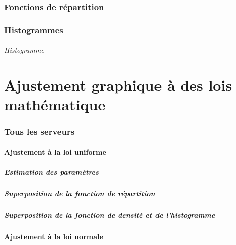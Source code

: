\documentclass{article}
\begin{document}
\section{Fonctions de répartition}

\section{Histogrammes}

\paragraph{Histogramme}
\begin{center}
\end{center}
\paragraph{}

\part{Ajustement graphique à des lois mathématique}

\section{Tous les serveurs}

\subsection{Ajustement à la loi uniforme}

\subsubsection{Estimation des paramètres}
\subsubsection{Superposition de la fonction de répartition}
\subsubsection{Superposition de la fonction de densité et de l'histogramme}

\subsection{Ajustement à la loi normale}
\end{document}

